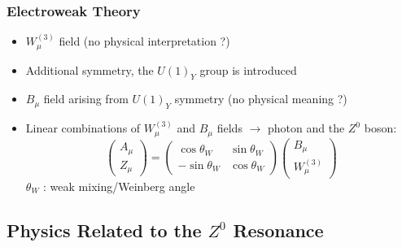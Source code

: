 \documentclass[10pt]{beamer}
\begin{document}
\begin{frame}
\frametitle{Electroweak Theory}
\begin{itemize}
\item $W^{(3)}_{\mu}$ field (no physical interpretation ?)
\item Additional symmetry, the $U(1)_{Y}$ group is introduced
\item $B_{\mu}$ field arising from $U(1)_{Y}$ symmetry (no physical meaning ?)
\item Linear combinations of $W^{(3)}_{\mu}$ and $B_{\mu}$ fields $\rightarrow$ photon and the $Z^{0}$ boson:
\begin{equation}
\begin{pmatrix} 
A_{\mu} \\ 
Z_{\mu} 
\end{pmatrix}
= 
\begin{pmatrix}
\cos \theta_{W} & \sin \theta_{W} \\
-\sin \theta_{W} & \cos \theta_{W} 
\end{pmatrix}
\begin{pmatrix}
B_{\mu} \\
W^{(3)}_{\mu}
\end{pmatrix}
\end{equation}
$\theta_{W}$ : weak mixing/Weinberg angle
\end{itemize}
\end{frame}

\subsection{Physics Related to the $Z^{0}$ Resonance}
\end{document}
